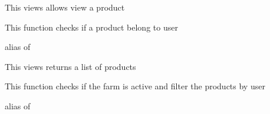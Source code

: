 \documentclass[letterpaper,10pt,english]{sphinxmanual}
\begin{document}

\begin{fulllineitems}
\label{modules/product:apps.product.views.ProductDetailView}
This views allows view a product

\begin{fulllineitems}
\label{modules/product:apps.product.views.ProductDetailView.get_object}
This function checks if a product belong to user

\end{fulllineitems}


\begin{fulllineitems}
\label{modules/product:apps.product.views.ProductDetailView.model}
alias of 

\end{fulllineitems}


\end{fulllineitems}


\begin{fulllineitems}
\label{modules/product:apps.product.views.ProductListView}
This views returns a list of products

\begin{fulllineitems}
\label{modules/product:apps.product.views.ProductListView.get_queryset}
This function checks if the farm is active and filter the products by user

\end{fulllineitems}


\begin{fulllineitems}
\label{modules/product:apps.product.views.ProductListView.model}
alias of 

\end{fulllineitems}


\end{fulllineitems}
\end{document}
